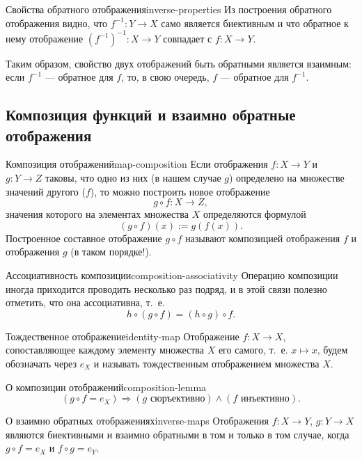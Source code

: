 \begin{properties}{Свойства обратного отображения}{inverse-properties}
  Из построения обратного отображения видно, что $f^{-1}:Y\to X$ само
  является биективным и что обратное к нему отображение
  $(f^{-1})^{-1}:X\to Y$ совпадает с $f:X\to Y$.

  Таким образом, свойство двух отображений быть обратными является
  взаимным: если $f^{-1}$ — обратное для $f$, то, в свою очередь, $f$ —
  обратное для $f^{-1}$.
\end{properties}

\subsection{Композиция функций и взаимно обратные отображения}

\begin{definition}{Композиция отображений}{map-composition}
  Если отображения $f:X\to Y$ и $g:Y\to Z$ таковы, что одно из них (в нашем
  случае $g$) определено на множестве значений другого ($f$), то можно
  построить новое отображение
  \[
    g\circ f:X\to Z,
  \]
  значения которого на элементах множества $X$ определяются формулой
  \[
    (g\circ f)(x):=g(f(x)).
  \]
  Построенное составное отображение $g\circ f$ называют композицией
  отображения $f$ и отображения $g$ (в таком порядке!).
\end{definition}

\begin{properties}{Ассоциативность композиции}{composition-associativity}
  Операцию композиции иногда приходится проводить несколько раз подряд, и
  в этой связи полезно отметить, что она ассоциативна, т.~е.
  \[
    h\circ(g\circ f)=(h\circ g)\circ f.
  \]
\end{properties}

\begin{definition}{Тождественное отображение}{identity-map}
  Отображение $f:X\to X$, сопоставляющее каждому элементу множества $X$ его
  самого, т.~е. $x\mapsto x$, будем обозначать через $e_X$ и называть
  тождественным отображением множества $X$.
\end{definition}

\begin{lemma}{О композиции отображений}{composition-lemma}
  \[
    (g\circ f=e_X)\Rightarrow
    (g\text{ сюръективно})\land(f\text{ инъективно}).
  \]
\end{lemma}

\begin{proposition}{О взаимно обратных отображениях}{inverse-maps}
  Отображения $f:X\to Y$, $g:Y\to X$ являются биективными и взаимно
  обратными в том и только в том случае, когда $g\circ f=e_X$ и
  $f\circ g=e_Y$.
\end{proposition}

